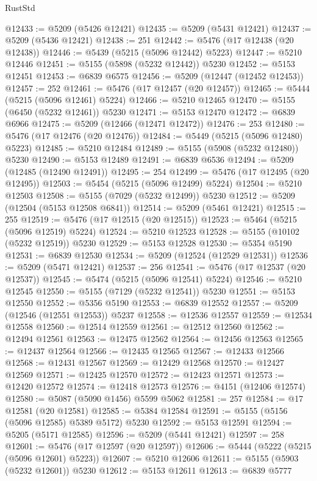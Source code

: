 \begin{lexlean}{RustStd}
\begin{coremodule}
@12433 := @5209 (@5426 @12421)
@12435 := @5209 (@5431 @12421)
@12437 := @5209 (@5436 @12421)
@12438 := 251
@12442 := @5476 (@17 @12438 (@20 @12438))
@12446 := @5439 (@5215 (@5096 @12442) @5223)
@12447 := @5210 @12446
@12451 := @5155 (@5898 (@5232 @12442)) @5230
@12452 := @5153 @12451
@12453 := @6839 @6575
@12456 := @5209 (@12447 (@12452 @12453))
@12457 := 252
@12461 := @5476 (@17 @12457 (@20 @12457))
@12465 := @5444 (@5215 (@5096 @12461) @5224)
@12466 := @5210 @12465
@12470 := @5155 (@6450 (@5232 @12461)) @5230
@12471 := @5153 @12470
@12472 := @6839 @6966
@12475 := @5209 (@12466 (@12471 @12472))
@12476 := 253
@12480 := @5476 (@17 @12476 (@20 @12476))
@12484 := @5449 (@5215 (@5096 @12480) @5223)
@12485 := @5210 @12484
@12489 := @5155 (@5908 (@5232 @12480)) @5230
@12490 := @5153 @12489
@12491 := @6839 @6536
@12494 := @5209 (@12485 (@12490 @12491))
@12495 := 254
@12499 := @5476 (@17 @12495 (@20 @12495))
@12503 := @5454 (@5215 (@5096 @12499) @5224)
@12504 := @5210 @12503
@12508 := @5155 (@7029 (@5232 @12499)) @5230
@12512 := @5209 (@12504 (@5153 @12508 @6841))
@12514 := @5209 (@5461 @12421)
@12515 := 255
@12519 := @5476 (@17 @12515 (@20 @12515))
@12523 := @5464 (@5215 (@5096 @12519) @5224)
@12524 := @5210 @12523
@12528 := @5155 (@10102 (@5232 @12519)) @5230
@12529 := @5153 @12528
@12530 := @5354 @5190
@12531 := @6839 @12530
@12534 := @5209 (@12524 (@12529 @12531))
@12536 := @5209 (@5471 @12421)
@12537 := 256
@12541 := @5476 (@17 @12537 (@20 @12537))
@12545 := @5474 (@5215 (@5096 @12541) @5224)
@12546 := @5210 @12545
@12550 := @5155 (@7129 (@5232 @12541)) @5230
@12551 := @5153 @12550
@12552 := @5356 @5190
@12553 := @6839 @12552
@12557 := @5209 (@12546 (@12551 @12553)) @5237
@12558 := @12536 @12557
@12559 := @12534 @12558
@12560 := @12514 @12559
@12561 := @12512 @12560
@12562 := @12494 @12561
@12563 := @12475 @12562
@12564 := @12456 @12563
@12565 := @12437 @12564
@12566 := @12435 @12565
@12567 := @12433 @12566
@12568 := @12431 @12567
@12569 := @12429 @12568
@12570 := @12427 @12569
@12571 := @12425 @12570
@12572 := @12423 @12571
@12573 := @12420 @12572
@12574 := @12418 @12573
@12576 := @4151 (@12406 @12574)
@12580 := @5087 (@5090 @1456) @5599 @5062
@12581 := 257
@12584 := @17 @12581 (@20 @12581)
@12585 := @5384 @12584
@12591 := @5155 (@5156 (@5096 @12585) @5389 @5172) @5230
@12592 := @5153 @12591
@12594 := @5205 (@5171 @12585)
@12596 := @5209 (@5441 @12421)
@12597 := 258
@12601 := @5476 (@17 @12597 (@20 @12597))
@12606 := @5444 (@5222 (@5215 (@5096 @12601) @5223))
@12607 := @5210 @12606
@12611 := @5155 (@5903 (@5232 @12601)) @5230
@12612 := @5153 @12611
@12613 := @6839 @5777

\end{coremodule}
\end{lexlean}
